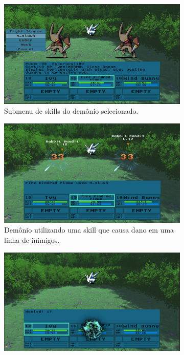\documentclass[
	12pt,				%
	openright,			%
	twoside,			%
	a4paper,			%
	english,			%
	french,				%
	spanish,			%
	brazil				%
	]{abntex2}
\begin{document}
\begin{figure}[h!]
  \centering
  \begin{subfigure}[b]{0.49\linewidth}
    \includegraphics[width=\linewidth]{skillmenu.jpg}
     \caption{Submenu de skills do demônio selecionado.}
  \end{subfigure}
  \begin{subfigure}[b]{0.49\linewidth}
    \includegraphics[width=\linewidth]{aoe.jpg}
    \caption{Demônio utilizando uma skill que causa dano em uma linha de inimigos.}
  \end{subfigure}
  \begin{subfigure}[b]{0.49\linewidth}
    \includegraphics[width=\linewidth]{heal.jpg}

\end{subfigure}
\end{figure}
\end{document}

